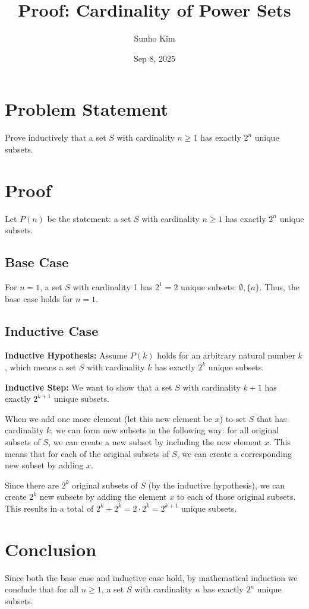 \documentclass{article}
\title{Proof: Cardinality of Power Sets}
\author{Sunho Kim}
\date{Sep 8, 2025}
\begin{document}
\maketitle

\section{Problem Statement}
Prove inductively that a set $S$ with cardinality $n \geq 1$ has exactly $2^n$ unique subsets.

\section{Proof}

Let $P(n)$ be the statement: a set $S$ with cardinality $n \geq 1$ has exactly $2^n$ unique subsets.

\subsection{Base Case}
For $n = 1$, a set $S$ with cardinality 1 has $2^1 = 2$ unique subsets: $\emptyset, \{a\}$. Thus, the base case holds for $n = 1$.

\subsection{Inductive Case}
\textbf{Inductive Hypothesis:} Assume $P(k)$ holds for an arbitrary natural number $k$, which means a set $S$ with cardinality $k$ has exactly $2^k$ unique subsets.

\textbf{Inductive Step:} We want to show that a set $S$ with cardinality $k+1$ has exactly $2^{k+1}$ unique subsets.

When we add one more element (let this new element be $x$) to set $S$ that has cardinality $k$, we can form new subsets in the following way: for all original subsets of $S$, we can create a new subset by including the new element $x$. This means that for each of the original subsets of $S$, we can create a corresponding new subset by adding $x$.

Since there are $2^k$ original subsets of $S$ (by the inductive hypothesis), we can create $2^k$ new subsets by adding the element $x$ to each of those original subsets. This results in a total of $2^k + 2^k = 2 \cdot 2^k = 2^{k+1}$ unique subsets.

\section{Conclusion}
Since both the base case and inductive case hold, by mathematical induction we conclude that for all $n \geq 1$, a set $S$ with cardinality $n$ has exactly $2^n$ unique subsets.
\end{document}
